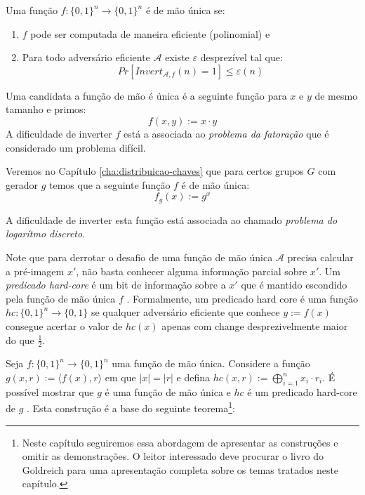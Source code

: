 Uma função $f: \{0,1\}^n \to \{0,1\}^n$ é de mão única se:
\begin{enumerate}
\item $f$ pode ser computada de maneira eficiente (polinomial) e
\item Para todo adversário eficiente $\mathcal{A}$ existe $\varepsilon$ desprezível tal que:
\begin{displaymath}
  Pr[Invert_{\mathcal{A}, f}(n) = 1] \leq \varepsilon(n)
\end{displaymath}
\end{enumerate}


\begin{example}
  Uma candidata a função de mão é única é a seguinte função para $x$ e $y$ de mesmo tamanho e primos:
  \begin{displaymath}
    f(x,y) := x \cdot y
  \end{displaymath}
  A dificuldade de inverter $f$ está a associada ao {\em problema da fatoração} que é considerado um problema difícil.

  Veremos no Capítulo \ref{cha:distribuicao-chaves} que para certos grupos $G$ com gerador $g$ temos que a seguinte função $f$ é de mão única:
  \begin{displaymath}
    f_g(x) := g^x
  \end{displaymath}

A dificuldade de inverter esta função está associada ao chamado {\em problema do logarítmo discreto}.
\end{example}


Note que para derrotar o desafio de uma função de mão única $\mathcal{A}$ precisa calcular a pré-imagem $x'$, não basta conhecer alguma informação parcial sobre $x'$.
Um {\em predicado hard-core} é um bit de informação sobre a $x'$ que é mantido escondido pela função de mão única $f$ \cite{Blum84}.
Formalmente, um predicado hard core é uma função $hc:\{0,1\}^n \to \{0,1\}$ se qualquer adversário eficiente que conhece $y := f(x)$ consegue acertar o valor de $hc(x)$ apenas com change desprezivelmente maior do que $\frac{1}{2}$.


Seja $f:\{0,1\}^n \to \{0,1\}^n$ uma função de mão única.
Considere a função $g(x,r) := \langle f(x), r \rangle$ em que $|x| = |r|$ e defina $hc(x,r) := \bigoplus_{i=1}^nx_i \cdot r_i$.
É possível mostrar que $g$ é uma função de mão única e $hc$ é um predicado hard-core de $g$ \cite{Goldreich89}.
Esta construção é a base do seguinte teorema\footnote{Neste capítulo seguiremos essa abordagem de apresentar as construções e omitir as demonstrações. O leitor interessado deve procurar o livro do Goldreich \cite{Goldreich07} para uma apresentação completa sobre os temas tratados neste capítulo.}:

